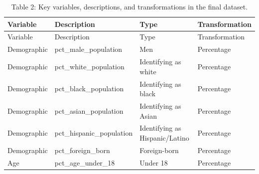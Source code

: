 \documentclass[
  number,
  review,
  3p]{elsarticle}
\begin{document}
\begin{longtable}[]{@{}
  >{\raggedright\arraybackslash}p{}
  >{\raggedright\arraybackslash}p{}
  >{\raggedright\arraybackslash}p{}
  >{\raggedright\arraybackslash}p{}@{}}
\caption{Table 2: Key variables, descriptions, and transformations in
the final dataset.}\tabularnewline
\toprule\noalign{}
\begin{minipage}[b]{\linewidth}\raggedright
Variable
\end{minipage} & \begin{minipage}[b]{\linewidth}\raggedright
Description
\end{minipage} & \begin{minipage}[b]{\linewidth}\raggedright
Type
\end{minipage} & \begin{minipage}[b]{\linewidth}\raggedright
Transformation
\end{minipage} \\
\midrule\noalign{}
\endfirsthead
\toprule\noalign{}
\begin{minipage}[b]{\linewidth}\raggedright
Variable
\end{minipage} & \begin{minipage}[b]{\linewidth}\raggedright
Description
\end{minipage} & \begin{minipage}[b]{\linewidth}\raggedright
Type
\end{minipage} & \begin{minipage}[b]{\linewidth}\raggedright
Transformation
\end{minipage} \\
\midrule\noalign{}
\endhead
\bottomrule\noalign{}
\endlastfoot
Demographic & pct\_male\_population & Men & Percentage \\
Demographic & pct\_white\_population & Identifying as white &
Percentage \\
Demographic & pct\_black\_population & Identifying as black &
Percentage \\
Demographic & pct\_asian\_population & Identifying as Asian &
Percentage \\
Demographic & pct\_hispanic\_population & Identifying as Hispanic/Latino
& Percentage \\
Demographic & pct\_foreign\_born & Foreign-born & Percentage \\
Age & pct\_age\_under\_18 & Under 18 & Percentage \\

\end{longtable}
\end{document}
